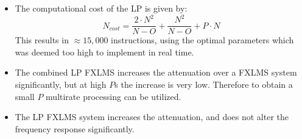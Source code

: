 \large
\begin{itemize}
\item The computational cost of the LP is given by:
	  \begin{equation}
	  N_{cost}=\frac{2\cdot N^2}{N-O}+\frac{N^2}{N-O}+P\cdot N
	  \end{equation}
	  This results in $\approx15,000$ instructions, using the optimal parameters which was deemed too high to implement in real time. \\
\item The combined LP FXLMS increases the attenuation over a FXLMS system significantly, but at high $P$s the increase is very low. 
	  Therefore to obtain a small $P$ multirate processing can be utilized. \\ 
\item The LP FXLMS system increases the attenuation, and does not alter the frequency response significantly.


\end{itemize}

